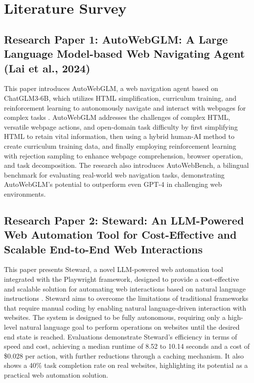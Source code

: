 \documentclass[conference]{IEEEtran}
\begin{document}
\section{Literature Survey}

\subsection{Research Paper 1: AutoWebGLM: A Large Language Model-based Web Navigating Agent (Lai et al., 2024)}
This paper introduces AutoWebGLM, a web navigation agent based on ChatGLM3-6B, which utilizes HTML simplification, curriculum training, and reinforcement learning to autonomously navigate and interact with webpages for complex tasks \cite{lai2024autowebglm}. AutoWebGLM addresses the challenges of complex HTML, versatile webpage actions, and open-domain task difficulty by first simplifying HTML to retain vital information, then using a hybrid human-AI method to create curriculum training data, and finally employing reinforcement learning with rejection sampling to enhance webpage comprehension, browser operation, and task decomposition. The research also introduces AutoWebBench, a bilingual benchmark for evaluating real-world web navigation tasks, demonstrating AutoWebGLM's potential to outperform even GPT-4 in challenging web environments.

\subsection{Research Paper 2: Steward: An LLM-Powered Web Automation Tool for Cost-Effective and Scalable End-to-End Web Interactions}
This paper presents Steward, a novel LLM-powered web automation tool integrated with the Playwright framework, designed to provide a cost-effective and scalable solution for automating web interactions based on natural language instructions \cite{steward2024}. Steward aims to overcome the limitations of traditional frameworks that require manual coding by enabling natural language-driven interaction with websites. The system is designed to be fully autonomous, requiring only a high-level natural language goal to perform operations on websites until the desired end state is reached. Evaluations demonstrate Steward's efficiency in terms of speed and cost, achieving a median runtime of 8.52 to 10.14 seconds and a cost of \$0.028 per action, with further reductions through a caching mechanism. It also shows a 40\% task completion rate on real websites, highlighting its potential as a practical web automation solution.
\end{document}
